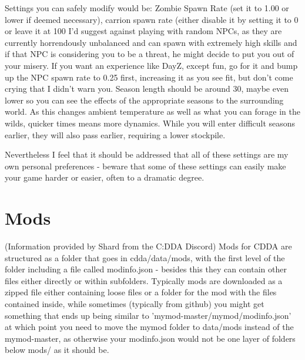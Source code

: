\documentclass[11pt]{report}
\begin{document}
Settings you can safely modify would be: Zombie Spawn Rate (set it to 1.00 or lower if deemed necessary), carrion spawn rate (either disable it by setting it to 0 or leave it at 100%
I'd suggest against playing with random NPCs, as they are currently horrendously unbalanced and can spawn with extremely high skills and if that NPC is considering you to be a threat, he might decide to put you out of your misery. If you want an experience like DayZ, except fun, go for it and bump up the NPC spawn rate to 0.25 first, increasing it as you see fit, but don't come crying that I didn't warn you.
Season length should be around 30, maybe even lower so you can see the effects of the appropriate seasons to the surrounding world. As this changes ambient temperature as well as what you can forage in the wilds, quicker times means more dynamics. While you will enter difficult seasons earlier, they will also pass earlier, requiring a lower stockpile.

Nevertheless I feel that it should be addressed that all of these settings are my own personal preferences - beware that some of these settings can easily make your game harder or easier, often to a dramatic degree.

\section{Mods}

(Information provided by Shard from the C:DDA Discord)
Mods for CDDA are structured as a folder that goes in cdda/data/mods, with the first level of the folder including a file called modinfo.json - besides this they can contain other files either directly or within subfolders.  Typically mods are downloaded as a zipped file either containing loose files or a folder for the mod with the files contained inside, while sometimes (typically from github) you might get something that ends up being similar to 'mymod-master/mymod/modinfo.json' at which point you need to move the mymod folder to data/mods instead of the mymod-master, as otherwise your modinfo.json would not be one layer of folders below mods/ as it should be.
\end{document}
